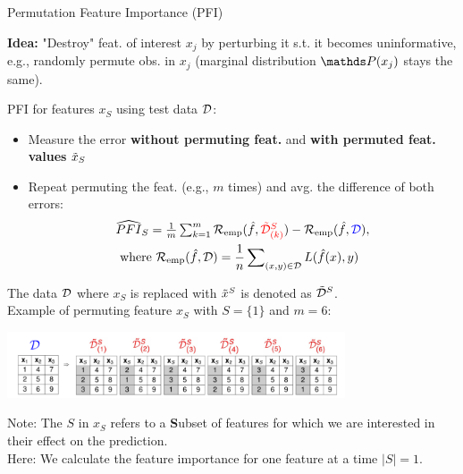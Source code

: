 \documentclass[11pt,compress,t,notes=noshow, aspectratio=169, xcolor=table]{beamer}
\begin{document}

\begin{frame}{Permutation Feature Importance (PFI) }



\textbf{Idea:} "Destroy" feat. of interest $x_j$ by perturbing it s.t. it becomes uninformative, e.g., randomly permute obs. in $x_j$ (marginal distribution $\P(x_j)$ stays the same).  %

PFI for features $x_S$ using test data $\D$:
\begin{itemize}
  \item Measure the error {\color{blue}\textbf{without permuting feat.}} and {\color{red}\textbf{with permuted feat. values}} $\pert{x}{}{}_S$
  \item Repeat permuting the feat. (e.g., $m$ times) and avg. the difference of both errors: 
\begin{align*}
&\widehat{PFI}_S = \tfrac{1}{m} \textstyle\sum\nolimits_{k = 1}^{m} \riske (\fh, {\color{red}\pert{\D}{S}{}_{(k)}}) - \riske (\fh, {\color{blue}\D}),\\&\text{ where }
\riske(\fh, \D) = \frac{1}{n} \sum\nolimits_{(x, y) \in \D}  L(\fh(x), y)
\end{align*}
\end{itemize}
\pause
The data $\D$ where $x_S$ is replaced with $\pert{x}{S}{}$ is denoted as $\pert{\D}{S}{}$.\\
Example of permuting feature $x_S$ with $S = \{1\}$ and $m=6$:

\begin{center}
\includegraphics[width=0.75\textwidth]{figure_man/permuted-fv.pdf}
\end{center}

\vspace*{0.2cm}
{\scriptsize{Note: 
The $S$ in $x_S$ refers to a \textbf{S}ubset of features for which we are interested in their effect on the prediction.\\
Here: We calculate the feature importance for one feature at a time $|S| = 1$.}\par}

\end{frame}
\end{document}

